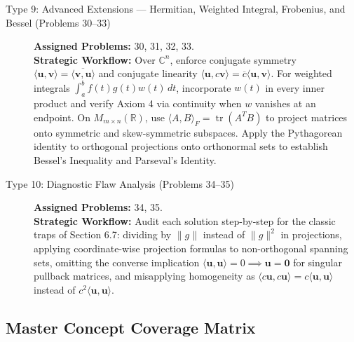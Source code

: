 \documentclass[11pt, letterpaper]{article}
\theoremstyle{definition}
\theoremstyle{remark}
\begin{document}
\begin{description}
    \item[{Type 9: Advanced Extensions --- Hermitian, Weighted Integral, Frobenius, and Bessel (Problems 30--33)}]
    \textbf{Assigned Problems:} 30, 31, 32, 33.\\
    \textbf{Strategic Workflow:} Over $\mathbb{C}^n$, enforce conjugate symmetry $\langle \mathbf{u}, \mathbf{v} \rangle = \overline{\langle \mathbf{v}, \mathbf{u} \rangle}$ and conjugate linearity $\langle \mathbf{u}, c\mathbf{v} \rangle = \overline{c}\langle \mathbf{u}, \mathbf{v} \rangle$. For weighted integrals $\int_a^b f(t)g(t)w(t)\,dt$, incorporate $w(t)$ in every inner product and verify Axiom 4 via continuity when $w$ vanishes at an endpoint. On $M_{m\times n}(\mathbb{R})$, use $\langle A, B \rangle_F = \operatorname{tr}(A^T B)$ to project matrices onto symmetric and skew-symmetric subspaces. Apply the Pythagorean identity to orthogonal projections onto orthonormal sets to establish Bessel's Inequality and Parseval's Identity.

    \item[{Type 10: Diagnostic Flaw Analysis (Problems 34--35)}]
    \textbf{Assigned Problems:} 34, 35.\\
    \textbf{Strategic Workflow:} Audit each solution step-by-step for the classic traps of Section 6.7: dividing by $\|g\|$ instead of $\|g\|^2$ in projections, applying coordinate-wise projection formulas to non-orthogonal spanning sets, omitting the converse implication $\langle \mathbf{u}, \mathbf{u} \rangle = 0 \implies \mathbf{u} = \mathbf{0}$ for singular pullback matrices, and misapplying homogeneity as $\langle c\mathbf{u}, c\mathbf{u} \rangle = c\langle \mathbf{u}, \mathbf{u} \rangle$ instead of $c^2\langle \mathbf{u}, \mathbf{u} \rangle$.
\end{description}

\subsection{Master Concept Coverage Matrix}
\end{document}
